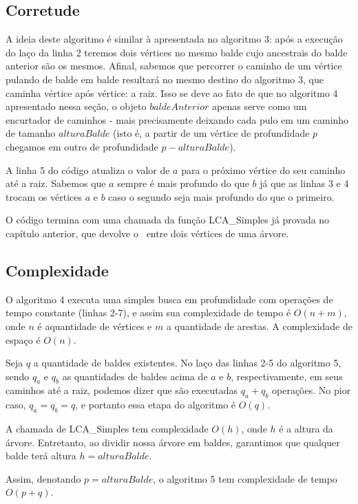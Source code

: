 \subsection{Corretude}

A ideia deste algoritmo é similar à apresentada no algoritmo 3: após a execução do laço da linha 2 teremos dois vértices no mesmo balde cujo ancestrais do balde anterior são os mesmos. Afinal, sabemos que percorrer o caminho de um vértice pulando de balde em balde resultará no mesmo destino do algoritmo 3, que caminha vértice após vértice: a raiz. Isso se deve ao fato de que no algoritmo 4 apresentado nessa seção, o objeto $baldeAnterior$ apenas serve como um encurtador de caminhos - mais precisamente deixando cada pulo em um caminho de  tamanho $alturaBalde$ (isto é, a partir de um vértice de profundidade $p$ chegamos em outro de profundidade $p - alturaBalde$).

A linha 5 do código atualiza o valor de $a$ para o próximo vértice do seu caminho até a raiz. Sabemos que $a$ sempre é mais profundo do que $b$ já que as linhas 3 e 4 trocam os vértices $a$ e $b$ caso o segundo seja mais profundo do que o primeiro.

O código termina com uma chamada da função LCA\_Simples já provada no capítulo anterior, que devolve o \LCA\ entre dois vértices de uma árvore.

\subsection{Complexidade}

O algoritmo 4 executa uma simples busca em profundidade com operações de tempo constante (linhas 2-7), e assim sua complexidade de tempo é $O(n+m)$, onde $n$ é aquantidade de vértices e $m$ a quantidade de arestas. A complexidade de espaço é $O(n)$.

Seja $q$ a quantidade de baldes existentes. No laço das linhas 2-5 do algoritmo 5, sendo $q_a$ e $q_b$ as quantidades de baldes acima de $a$ e $b$, respectivamente, em seus caminhos até a raiz, podemos dizer que são executadas $q_a + q_b$ operações. No pior caso, $q_a = q_b = q$, e portanto essa etapa do algoritmo é $O(q)$.

A chamada de LCA\_Simples tem complexidade $O(h)$, onde $h$ é a altura da árvore. Entretanto, ao dividir nossa árvore em baldes, garantimos que qualquer balde terá altura $h = alturaBalde$.

Assim, denotando $p = alturaBalde$, o algoritmo 5 tem complexidade de tempo $O(p + q)$.

